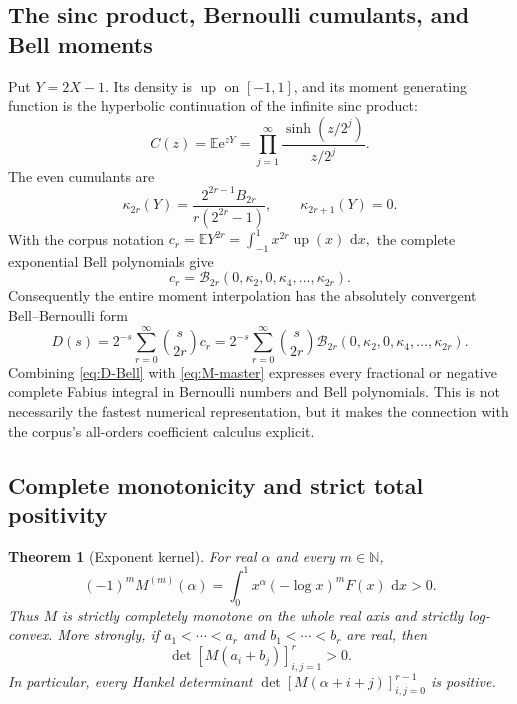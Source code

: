 \documentclass[11pt,oneside]{article}
\numberwithin{equation}{section}
\newtheorem{theorem}{Theorem}[section]
\theoremstyle{definition}
\theoremstyle{remark}
\newcommand{\N}{\mathbb N}
\newcommand{\E}{\mathbb E}
\newcommand{\Up}{\operatorname{up}}
\newcommand{\dd}{\,\mathrm d}
\newcommand{\e}{\mathrm e}
\newcommand{\Bell}{\mathcal B}
\begin{document}
\subsection{The sinc product, Bernoulli cumulants, and Bell moments}

Put $Y=2X-1$.  Its density is $\Up$ on $[-1,1]$, and its moment generating function is the
hyperbolic continuation of the infinite sinc product:
\begin{equation}
 C(z)=\E\e^{zY}
 =\prod_{j=1}^{\infty}\frac{\sinh(z/2^j)}{z/2^j}.             \label{eq:C-product}
\end{equation}
The even cumulants are
\begin{equation}
 \kappa_{2r}(Y)=\frac{2^{2r-1}B_{2r}}{r(2^{2r}-1)},
 \qquad \kappa_{2r+1}(Y)=0.                                  \label{eq:Y-cumulants}
\end{equation}
With the corpus notation
\(
 c_r=\E Y^{2r}=\int_{-1}^{1}x^{2r}\Up(x)\,\dd x,
\)
the complete exponential Bell polynomials give
\begin{equation}
 c_r=\Bell_{2r}(0,\kappa_2,0,\kappa_4,\ldots,\kappa_{2r}).    \label{eq:Bell-moments}
\end{equation}
Consequently the entire moment interpolation has the absolutely convergent Bell--Bernoulli
form
\begin{equation}
 \boxed{
 D(s)=2^{-s}\sum_{r=0}^{\infty}\binom{s}{2r}c_r
 =2^{-s}\sum_{r=0}^{\infty}\binom{s}{2r}
 \Bell_{2r}(0,\kappa_2,0,\kappa_4,\ldots,\kappa_{2r}).}
 \label{eq:D-Bell}
\end{equation}
Combining \eqref{eq:D-Bell} with \eqref{eq:M-master} expresses every fractional or negative
complete Fabius integral in Bernoulli numbers and Bell polynomials.  This is not necessarily
the fastest numerical representation, but it makes the connection with the corpus's
all-orders coefficient calculus explicit.

\subsection{Complete monotonicity and strict total positivity}

\begin{theorem}[Exponent kernel]
\label{thm:total-positive}
For real $\alpha$ and every $m\in\N$,
\begin{equation}
 (-1)^mM^{(m)}(\alpha)
 =\int_0^1x^\alpha(-\log x)^mF(x)\,\dd x>0.                  \label{eq:complete-monotone}
\end{equation}
Thus $M$ is strictly completely monotone on the whole real axis and strictly log-convex.
More strongly, if
\(a_1<\cdots<a_r\) and \(b_1<\cdots<b_r\) are real, then
\begin{equation}
 \det[M(a_i+b_j)]_{i,j=1}^r>0.                               \label{eq:strict-TP}
\end{equation}
In particular, every Hankel determinant
$\det[M(\alpha+i+j)]_{i,j=0}^{r-1}$ is positive.
\end{theorem}
\end{document}
